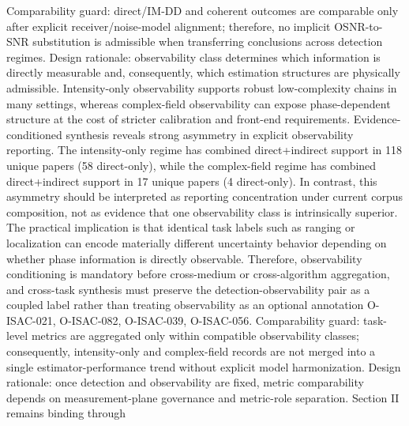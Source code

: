 {}Comparability guard: direct/IM-DD and coherent outcomes are comparable only after explicit receiver/noise-model alignment; therefore, no implicit OSNR-to-SNR substitution is admissible when transferring conclusions across detection regimes.\markdownRendererInterblockSeparator
{}
\markdownRendererSectionEnd \markdownRendererSectionBegin
{}\markdownRendererInterblockSeparator
{}Design rationale: observability class determines which information is directly measurable and, consequently, which estimation structures are physically admissible. Intensity-only observability supports robust low-complexity chains in many settings, whereas complex-field observability can expose phase-dependent structure at the cost of stricter calibration and front-end requirements.\markdownRendererParagraphSeparator
{}Evidence-conditioned synthesis reveals strong asymmetry in explicit observability reporting. The intensity-only regime has combined direct+indirect support in 118 unique papers (58 direct-only), while the complex-field regime has combined direct+indirect support in 17 unique papers (4 direct-only). In contrast, this asymmetry should be interpreted as reporting concentration under current corpus composition, not as evidence that one observability class is intrinsically superior. The practical implication is that identical task labels such as ranging or localization can encode materially different uncertainty behavior depending on whether phase information is directly observable. Therefore, observability conditioning is mandatory before cross-medium or cross-algorithm aggregation, and cross-task synthesis must preserve the detection-observability pair as a coupled label rather than treating observability as an optional annotation O-ISAC-021, O-ISAC-082, O-ISAC-039, O-ISAC-056.\markdownRendererParagraphSeparator
{}Comparability guard: task-level metrics are aggregated only within compatible observability classes; consequently, intensity-only and complex-field records are not merged into a single estimator-performance trend without explicit model harmonization.\markdownRendererInterblockSeparator
{}
\markdownRendererSectionEnd \markdownRendererSectionBegin
{}\markdownRendererInterblockSeparator
{}Design rationale: once detection and observability are fixed, metric comparability depends on measurement-plane governance and metric-role separation. Section II remains binding through\markdownRendererSoftLineBreak
{}\markdownRendererSoftLineBreak
